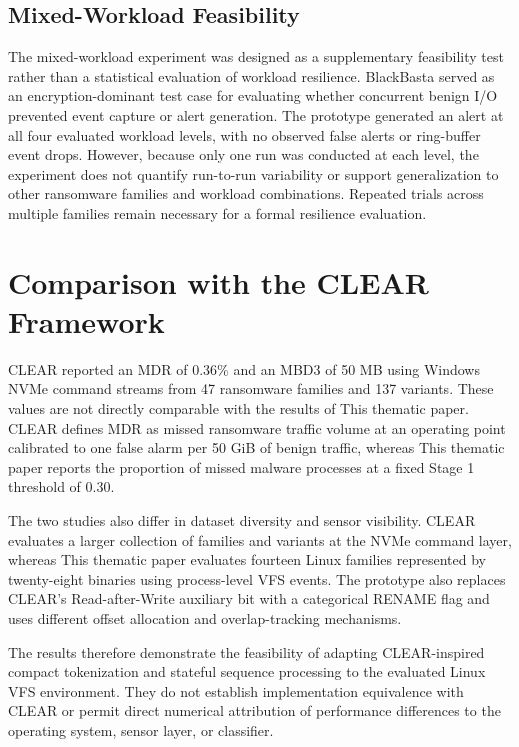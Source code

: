 \subsection{Mixed-Workload Feasibility}\label{sec:5.1.4}

The mixed-workload experiment was designed as a supplementary feasibility test rather than a statistical evaluation of workload resilience. BlackBasta served as an encryption-dominant test case for evaluating whether concurrent benign I/\allowbreak{}O prevented event capture or alert generation. The prototype generated an alert at all four evaluated workload levels, with no observed false alerts or ring-buffer event drops. However, because only one run was conducted at each level, the experiment does not quantify run-to-run variability or support generalization to other ransomware families and workload combinations. Repeated trials across multiple families remain necessary for a formal resilience evaluation.

\section{Comparison with the CLEAR Framework}\label{sec:5.2}

CLEAR \cite{ref9} reported an MDR of 0.36\% and an MBD3 of 50 MB using Windows NVMe command streams from 47 ransomware families and 137 variants. These values are not directly comparable with the results of This thematic paper. CLEAR defines MDR as missed ransomware traffic volume at an operating point calibrated to one false alarm per 50 GiB of benign traffic, whereas This thematic paper reports the proportion of missed malware processes at a fixed Stage 1 threshold of 0.30.

The two studies also differ in dataset diversity and sensor visibility. CLEAR evaluates a larger collection of families and variants at the NVMe command layer, whereas This thematic paper evaluates fourteen Linux families represented by twenty-eight binaries using process-level VFS events. The prototype also replaces CLEAR's Read-after-Write auxiliary bit with a categorical RENAME flag and uses different offset allocation and overlap-tracking mechanisms.

The results therefore demonstrate the feasibility of adapting CLEAR-inspired compact tokenization and stateful sequence processing to the evaluated Linux VFS environment. They do not establish implementation equivalence with CLEAR or permit direct numerical attribution of performance differences to the operating system, sensor layer, or classifier.


